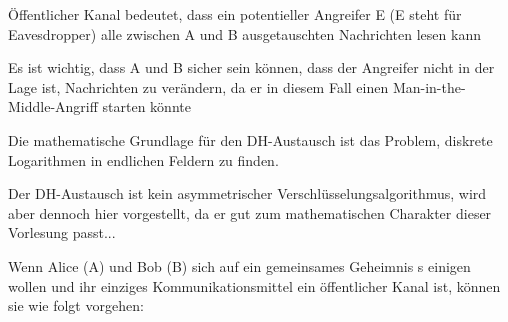 \documentclass[a4paper]{article}
\begin{document}
\begin{multicols}{3}
\begin{itemize*}
            \begin{itemize*}
                  \item Öffentlicher Kanal bedeutet, dass ein potentieller Angreifer E (E steht für Eavesdropper) alle zwischen A und B ausgetauschten Nachrichten lesen kann
                  \item Es ist wichtig, dass A und B sicher sein können, dass der Angreifer nicht in der Lage ist, Nachrichten zu verändern, da er in diesem Fall einen Man-in-the-Middle-Angriff starten könnte
                  \item Die mathematische Grundlage für den DH-Austausch ist das Problem, diskrete Logarithmen in endlichen Feldern zu finden.
                  \item Der DH-Austausch ist kein asymmetrischer Verschlüsselungsalgorithmus, wird aber dennoch hier vorgestellt, da er gut zum mathematischen Charakter dieser Vorlesung passt...
            \end{itemize*}
            \item
            Wenn Alice (A) und Bob (B) sich auf ein gemeinsames Geheimnis s
            einigen wollen und ihr einziges Kommunikationsmittel ein öffentlicher
            Kanal ist, können sie wie folgt vorgehen:


\end{itemize*}
\end{multicols}
\end{document}
